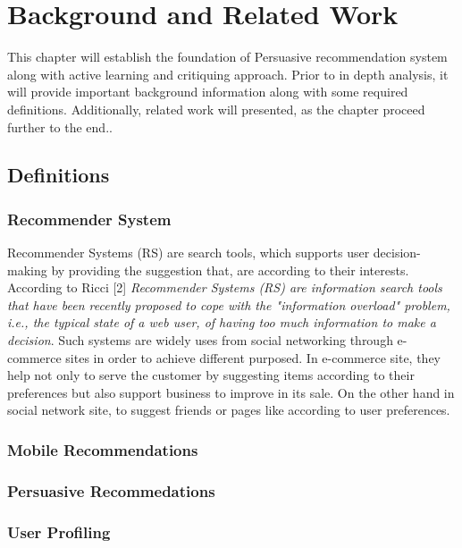 
\chapter{Background and Related Work}

This chapter will establish the foundation of Persuasive recommendation system along with active learning and critiquing approach. Prior to in depth analysis, it will provide important background information along with some required definitions. Additionally, related work will presented, as the chapter proceed further to the end..\newline

\section{Definitions}

\subsection{Recommender System}

Recommender Systems (RS) are search tools, which supports user decision-making by providing the suggestion that, are according to their interests. According to Ricci [2] \textit{Recommender Systems (RS) are information search tools that have been recently proposed to cope with the "information overload" problem, i.e., the typical state of a web user, of having too much information to make a decision}.  Such systems are widely uses from social networking through e-commerce sites in order to achieve different purposed. In e-commerce site, they help not only to serve the customer by suggesting items according to their preferences but also support business to improve in its sale. On the other hand in social network site, to suggest friends or pages like according to user preferences.

\subsection{Mobile Recommendations}

\subsection{Persuasive Recommedations}

\subsection{User Profiling}

